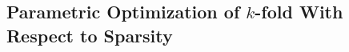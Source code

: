 \documentclass[mnsc,nonblindrev]{informs3} %
\begin{document}


\subsection{Parametric Optimization of $k$-fold With Respect to Sparsity}\label{ssec:parametric}
\end{document}
